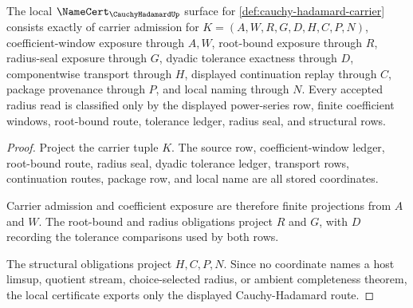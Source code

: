 \begin{theorem}
\label{thm:cauchy-hadamard-namecert-obligations}
The local $\NameCert_{\CauchyHadamardUp}$ surface for \autoref{def:cauchy-hadamard-carrier} consists exactly of carrier admission for $K=(A,W,R,G,D,H,C,P,N)$, coefficient-window exposure through $A,W$, root-bound exposure through $R$, radius-seal exposure through $G$, dyadic tolerance exactness through $D$, componentwise transport through $H$, displayed continuation replay through $C$, package provenance through $P$, and local naming through $N$. Every accepted radius read is classified only by the displayed power-series row, finite coefficient windows, root-bound route, tolerance ledger, radius seal, and structural rows.
\end{theorem}
\begin{proof}
Project the carrier tuple $K$. The source row, coefficient-window ledger, root-bound route, radius seal, dyadic tolerance ledger, transport rows, continuation routes, package row, and local name are all stored coordinates.

Carrier admission and coefficient exposure are therefore finite projections from $A$ and $W$. The root-bound and radius obligations project $R$ and $G$, with $D$ recording the tolerance comparisons used by both rows.

The structural obligations project $H,C,P,N$. Since no coordinate names a host limsup, quotient stream, choice-selected radius, or ambient completeness theorem, the local certificate exports only the displayed Cauchy-Hadamard route.
\end{proof}

